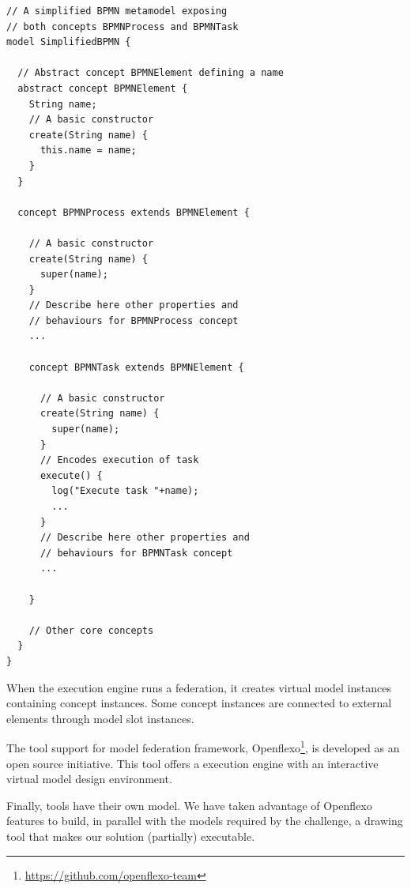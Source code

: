 \begin{lstlisting}
// A simplified BPMN metamodel exposing
// both concepts BPMNProcess and BPMNTask
model SimplifiedBPMN {

  // Abstract concept BPMNElement defining a name
  abstract concept BPMNElement {
    String name;
    // A basic constructor
    create(String name) {
      this.name = name;
    }
  }

  concept BPMNProcess extends BPMNElement {

    // A basic constructor
    create(String name) {
      super(name);
    }
    // Describe here other properties and
    // behaviours for BPMNProcess concept
    ...

    concept BPMNTask extends BPMNElement {

      // A basic constructor
      create(String name) {
        super(name);
      }
      // Encodes execution of task
      execute() {
        log("Execute task "+name);
        ...
      }
      // Describe here other properties and
      // behaviours for BPMNTask concept
      ...

    }

    // Other core concepts
  }
}
\end{lstlisting}


When the \FML execution engine runs a federation, it creates virtual
model instances containing concept instances. Some concept instances
are connected to external elements through model slot instances.


The tool support for model federation framework,
Openflexo\footnote{\url{https://github.com/openflexo-team}}, is
developed as an open source initiative. This tool offers a \FML
execution engine with an interactive virtual model design environment.

Finally, tools have their own model. We have taken advantage of
Openflexo features to build, in parallel with the models  required by the challenge, a drawing tool that makes our
solution (partially) executable.
